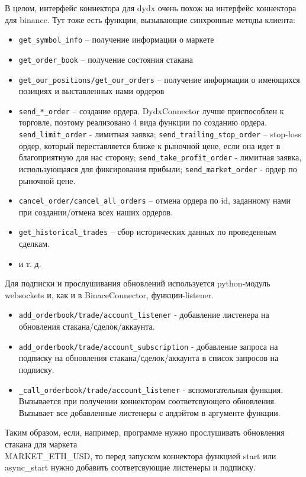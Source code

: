 В целом, интерфейс коннектора для dydx очень похож на интерфейс коннектора для binance. Тут тоже есть функции, вызывающие синхронные методы клиента:

\begin{itemize}
    \item \texttt{get\_symbol\_info} -- получение информации о маркете
    \item \texttt{get\_order\_book} -- получение состояния стакана
    \item \texttt{get\_our\_positions/get\_our\_orders} -- получение информации о имеющихся позициях и выставленных нами ордеров
    \item \texttt{send\_*\_order} -- создание ордера. DydxConnector лучше приспособлен к торговле, поэтому реализовано 4 вида функции по созданию ордера. \texttt{send\_limit\_order} - лимитная заявка; \texttt{send\_trailing\_stop\_order} -- stop-loss ордер, который переставляется ближе к рыночной цене, если она идет в благоприятную для нас сторону; \texttt{send\_take\_profit\_order} - лимитная заявка, использующаяся для фиксирования прибыли; \texttt{send\_market\_order} - ордер по рыночной цене.
    \item \texttt{cancel\_order/cancel\_all\_orders} -- отмена ордера по id, заданному нами при создании/отмена всех наших ордеров.
    \item \texttt{get\_historical\_trades} -- сбор исторических данных по проведенным сделкам.
    \item и т. д.
\end{itemize}

Для подписки и прослушивания обновлений используется python-модуль websockets и, как и в BinaceConnector, функции-listener.

\begin{itemize}
    \item \texttt{add\_orderbook/trade/account\_listener} - добавление листенера на обновления стакана/сделок/аккаунта.
    \item \texttt{add\_orderbook/trade/account\_subscription} - добавление запроса на подписку на обновления стакана/сделок/аккаунта в список запросов на подписку.
    \item \texttt{\_call\_orderbook/trade/account\_listener} - вспомогательная функция. Вызывается при получении коннектором соответсвующего обновления. Вызывает все добавленные листенеры с апдэйтом в аргументе функции.
\end{itemize}

Таким образом, если, например, программе нужно прослушивать обновления стакана для маркета \\MARKET\_ETH\_USD, то перед запуском коннектора функцией start или async\_start нужно добавить соответсвующие листенеры и подписку.

